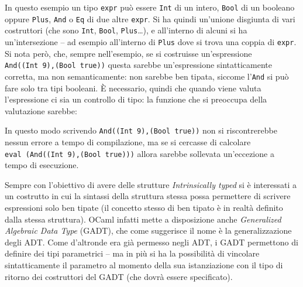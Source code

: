 \documentclass[12pt,a4paper]{report}
\begin{document}
\begin{Shaded}
\begin{Highlighting}[]
 
 
\end{Highlighting}
\end{Shaded}

In questo esempio un tipo \texttt{expr} può essere \texttt{Int} di un
intero, \texttt{Bool} di un booleano oppure \texttt{Plus}, \texttt{And}
o \texttt{Eq} di due altre \texttt{expr}. Si ha quindi un'unione
disgiunta di vari costruttori (che sono \texttt{Int}, \texttt{Bool},
\texttt{Plus}\ldots{}), e all'interno di alcuni si ha un'intersezione --
ad esempio all'interno di \texttt{Plus} dove si trova una coppia di
\texttt{expr}. Si nota però, che, sempre nell'esempio, se si costruisse
un'espressione \texttt{And((Int\ 9),(Bool\ true))} questa sarebbe
un'espressione sintatticamente corretta, ma non semanticamente: non
sarebbe ben tipata, siccome l'\texttt{And} si può fare solo tra tipi
booleani. È necessario, quindi che quando viene valuta l'espressione ci
sia un controllo di tipo: la funzione che si preoccupa della valutazione
sarebbe:

\begin{Shaded}
\begin{Highlighting}[]
 
\NormalTok{ (}
\NormalTok{    | _, _ -> }
\end{Highlighting}
\end{Shaded}

In questo modo scrivendo \texttt{And((Int\ 9),(Bool\ true))} non si
riscontrerebbe nessun errore a tempo di compilazione, ma se si cercasse
di calcolare \texttt{eval\ (And((Int\ 9),(Bool\ true)))} allora sarebbe
sollevata un'eccezione a tempo di esecuzione.

Sempre con l'obiettivo di avere delle strutture \emph{Intrinsically
typed} si è interessati a un costrutto in cui la sintassi della
struttura stessa possa permettere di scrivere espressioni solo ben
tipate (il concetto stesso di ben tipato è in realtà definito dalla
stessa struttura). OCaml infatti mette a disposizione anche
\emph{Generalized Algebraic Data Type} (GADT), che come suggerisce il
nome è la generalizzazione degli ADT. Come d'altronde era già permesso
negli ADT, i GADT permettono di definire dei tipi parametrici -- ma in
più si ha la possibilità di vincolare sintatticamente il parametro al
momento della sua istanziazione con il tipo di ritorno dei costruttori
del GADT (che dovrà essere specificato).
\end{document}
